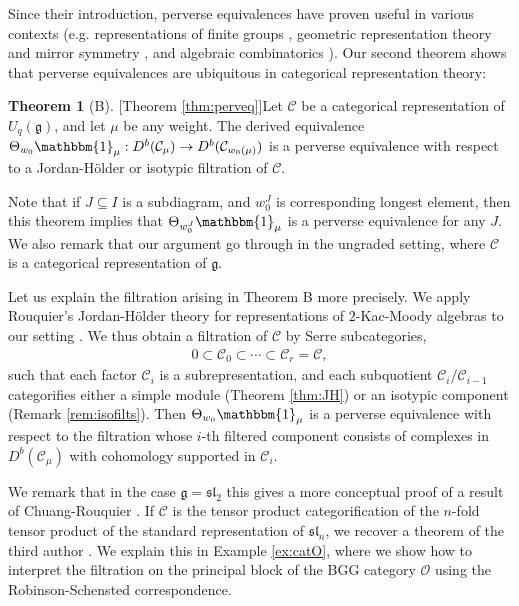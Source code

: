 \documentclass[11pt,reqno]{amsart}
\numberwithin{equation}{section}
\theoremstyle{definition}
\theoremstyle{named}
\newtheorem*{namedtheorem}{Theorem}
\newcommand{\cC}{\mathcal{C}}
\newcommand{\cO}{\mathcal{O}}
\newcommand{\fg}{\mathfrak{g}}
\newcommand{\fsl}{\mathfrak{sl}}
\newcommand{\bone}{\mathbbm{1}}
\begin{document}
Since their introduction, perverse equivalences have proven useful in various contexts (e.g. representations of finite groups \cite{Cra-Rou}, geometric representation theory and mirror symmetry \cite{Agan}, and algebraic combinatorics \cite{GJN}).  Our second theorem shows that perverse equivalences are ubiquitous in categorical representation theory:

\begin{namedtheorem}[B][Theorem \ref{thm:perveq}]\label{thm:B}
Let $\cC$ be a categorical representation of $U_q(\fg)$, and let $\mu$ be any weight.  The derived equivalence
$
\Theta_{w_0}\bone_\mu:D^b(\cC_\mu) \to D^b(\cC_{w_0(\mu)})
$
is a perverse equivalence with respect to a Jordan-H\"older or isotypic filtration of $\cC$.  
\end{namedtheorem}

Note that if $J\subseteq I$ is a subdiagram, and $w_0^J$ is corresponding longest element, then this theorem implies that $\Theta_{w_0^J}\bone_\mu$ is a perverse equivalence for any $J$.  We also remark that our argument go through  in the ungraded setting, where $\cC$ is a categorical representation of $\fg$.  

Let us explain the filtration arising in Theorem B more precisely.  We apply Rouquier's Jordan-H\"older theory for representations of $2$-Kac-Moody algebras to our setting \cite{Rou2KM}.  We thus obtain a filtration of $\cC$ by Serre subcategories, 
\begin{align*}
0\subset \cC_0 \subset \cdots \subset \cC_r=\cC,
\end{align*}
such that each factor $\cC_i$ is a subrepresentation, and each subquotient $\cC_i/\cC_{i-1}$ categorifies either a simple module (Theorem \ref{thm:JH}) or an isotypic component (Remark \ref{rem:isofilts}).  Then   $
\Theta_{w_0}\bone_\mu$ is a perverse equivalence with respect to the filtration whose $i$-th filtered component consists of complexes in $D^b(\cC_\mu)$ with cohomology supported in $\cC_i$.

We remark that in the case $\fg=\fsl_2$ this gives a more conceptual proof of a result of Chuang-Rouquier \cite[Proposition 8.4]{CRperv}.  If $\cC$ is the tensor product categorification of the $n$-fold tensor product of the standard representation of $\fsl_n$, we recover a theorem of the third author \cite{LosCacti}.  We explain this in Example \ref{ex:catO}, where we show how to interpret the filtration on the principal block of the BGG category $\cO$ using the Robinson-Schensted correspondence. 
\end{document}
